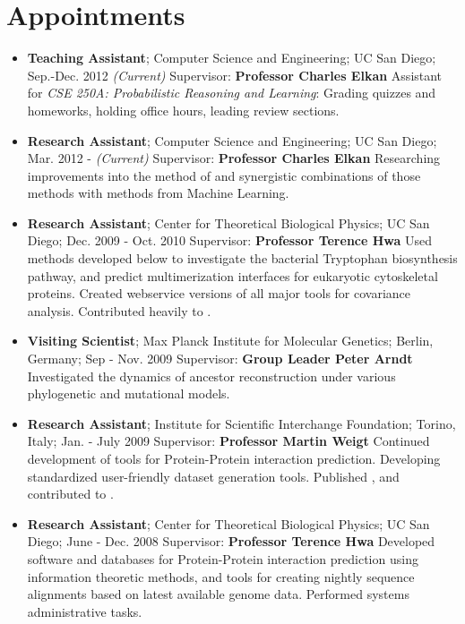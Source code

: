\section*{Appointments}
\begin{itemize}
	\item {\bf Teaching Assistant}; Computer Science and Engineering; UC San Diego; Sep.-Dec. 2012 {\it (Current)}
		\subitem Supervisor: {\bf Professor Charles Elkan }
		\subitem Assistant for {\it CSE 250A: Probabilistic Reasoning and Learning}: Grading quizzes and homeworks, holding office hours, leading review sections.
		
	\item {\bf Research Assistant}; Computer Science and Engineering; UC San Diego; Mar. 2012 - {\it (Current)}
		\subitem Supervisor: {\bf Professor Charles Elkan }
		\subitem Researching improvements into the method of \cite{Morcos2011a} and synergistic combinations of those methods with methods from Machine Learning.
	
	\item {\bf Research Assistant}; Center for Theoretical Biological Physics; UC San Diego; Dec. 2009 - Oct. 2010
		\subitem Supervisor: {\bf Professor Terence Hwa }
		\subitem Used methods developed below to investigate the bacterial Tryptophan biosynthesis pathway, and predict multimerization interfaces for eukaryotic cytoskeletal proteins. Created webservice versions of all major tools for covariance analysis. Contributed heavily to \cite{Morcos2011a}.
	
	\item {\bf Visiting Scientist}; Max Planck Institute for Molecular Genetics; Berlin, Germany; Sep - Nov. 2009
		\subitem Supervisor: {\bf Group Leader Peter Arndt }
		\subitem Investigated the dynamics of ancestor reconstruction under various phylogenetic and mutational models.
	
	\item {\bf Research Assistant}; Institute for Scientific Interchange Foundation; Torino, Italy; Jan. - July 2009
		\subitem Supervisor: {\bf Professor Martin Weigt }
		\subitem Continued development of tools for Protein-Protein interaction prediction. Developing standardized user-friendly dataset generation tools. Published \cite{Lunt2010a}, and contributed to \cite{Procaccini2011a}.
	
	\item {\bf Research Assistant}; Center for Theoretical Biological Physics; UC San Diego; June - Dec. 2008
		\subitem Supervisor: {\bf Professor Terence Hwa }
		\subitem Developed software and databases for Protein-Protein interaction prediction using information theoretic methods, and tools for creating nightly sequence alignments based on latest available genome data. Performed systems administrative tasks.
		

\end{itemize}

